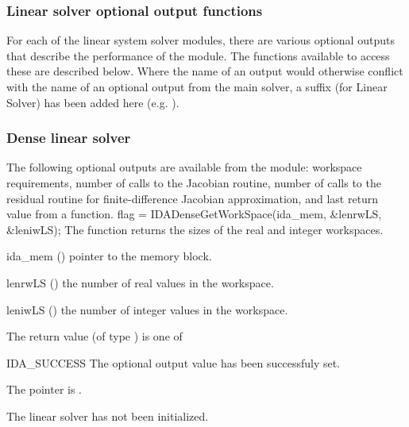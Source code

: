 {\subsubsection{Linear solver optional output functions}\label{sss:optout_linsol}

For each of the linear system solver modules, there are various optional 
outputs that describe the performance of the module. The functions available 
to access these are described below.  Where the name of an output would
otherwise conflict with the name of an optional output from the main
solver, a suffix  (for Linear Solver) has been added here (e.g.
).

\subsubsection{Dense linear solver}\label{sss:optout_dense}
The following optional outputs are available from the {\idadense} module:
workspace requirements, number of calls to the Jacobian routine, number of 
calls to the residual routine for finite-difference Jacobian approximation,
and last return value from a {\idadense} function.
{
  flag = IDADenseGetWorkSpace(ida\_mem, \&lenrwLS, \&leniwLS);
}
{
  The function  returns the sizes of
  the {\idadense} real and integer workspaces.
}
{
  \begin{args}
  \item[ida\_mem] ()
    pointer to the {\ida} memory block.
  \item[lenrwLS] ()
    the number of real values in the {\idadense} workspace.
  \item[leniwLS] ()
    the number of integer values in the {\idadense} workspace.
  \end{args}
}
{
  The return value  (of type ) is one of
  \begin{args}
  \item[IDA\_SUCCESS] 
    The optional output value has been successfuly set.
  \item[\Id{IDA\_MEM\_NULL}]
    The  pointer is .
  \item[\Id{IDA\_MEM\_NULL}]
    The {\idadense} linear solver has not been initialized.
  \end{args}
}
{
}}
